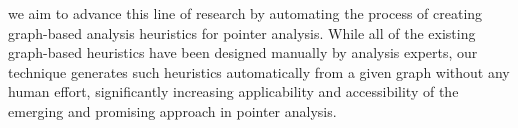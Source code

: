 %
%


we aim to advance this line of research by automating the process of creating graph-based analysis heuristics for pointer analysis.
While all of the existing graph-based heuristics have been designed manually by analysis experts,
our technique generates such heuristics automatically from a given graph without any human effort, significantly increasing  applicability and accessibility of the emerging and promising approach in pointer analysis.

